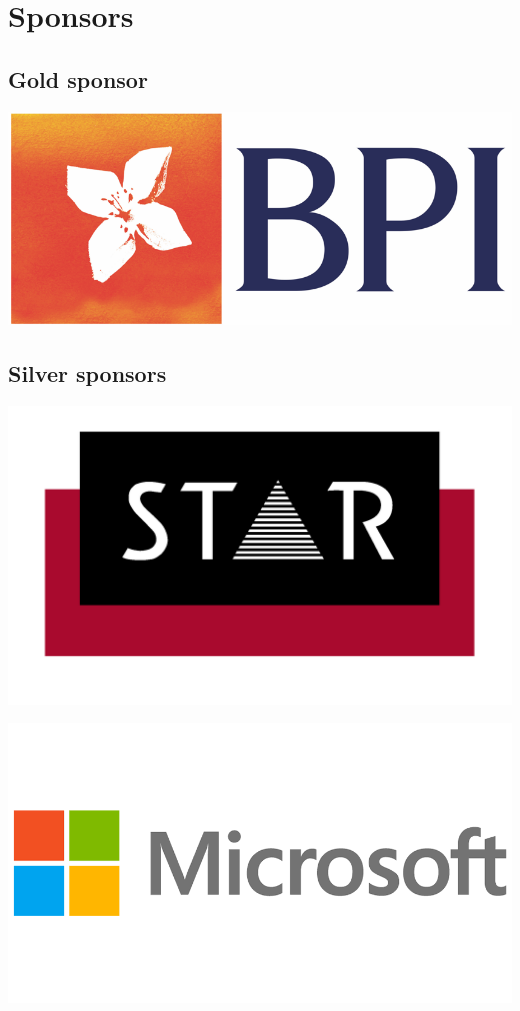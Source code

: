 \documentclass[a4paper,11pt,twoside]{book}
\begin{document}
\chapter*{Sponsors}

\section*{Gold sponsor}

\vfill

\begin{center}
\includegraphics[width=1\columnwidth]{logos/bpi-logo.png}
\end{center}

\vfill

\section*{Silver sponsors}

\vfill

\begin{center}
\includegraphics[width=0.8\columnwidth]{logos/star-logo.png}

\vfill

\includegraphics[width=0.9\columnwidth]{logos/microsoft-logo.png}
\end{center}
\end{document}
